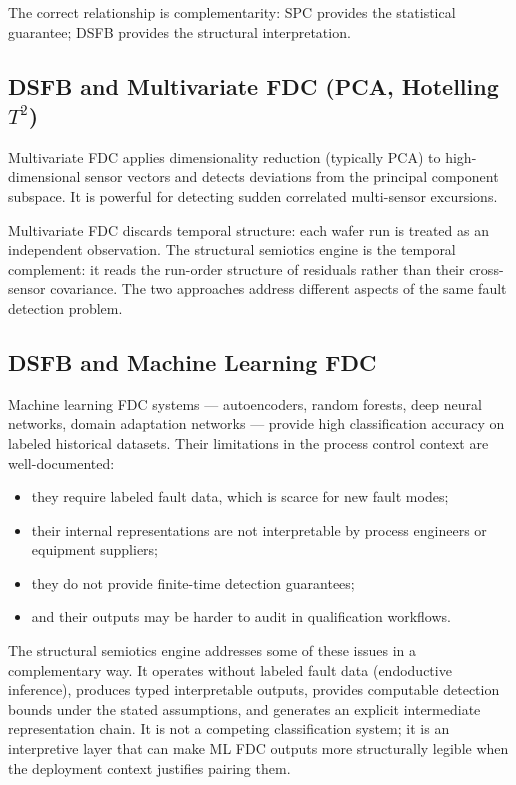 \documentclass[11pt,letterpaper]{article}
\theoremstyle{scresult}
\begin{document}
The correct relationship is complementarity: SPC provides the statistical
guarantee; DSFB provides the structural interpretation.

\subsection{\texorpdfstring{DSFB and Multivariate FDC (PCA, Hotelling $T^2$)}{DSFB and Multivariate FDC (PCA, Hotelling T2)}}

Multivariate FDC applies dimensionality reduction (typically PCA) to
high-dimensional sensor vectors and detects deviations from the principal
component subspace. It is powerful for detecting sudden correlated
multi-sensor excursions.

Multivariate FDC discards temporal structure: each wafer run is treated as
an independent observation. The structural semiotics engine is the
temporal complement: it reads the run-order structure of residuals rather
than their cross-sensor covariance. The two approaches address different
aspects of the same fault detection problem.

\subsection{DSFB and Machine Learning FDC}

Machine learning FDC systems --- autoencoders, random forests, deep neural
networks, domain adaptation networks --- provide high classification accuracy
on labeled historical datasets. Their limitations in the process control
context are well-documented:
\begin{itemize}
  \item they require labeled fault data, which is scarce for new fault modes;
  \item their internal representations are not interpretable by process
        engineers or equipment suppliers;
  \item they do not provide finite-time detection guarantees;
  \item and their outputs may be harder to audit in qualification workflows.
\end{itemize}

The structural semiotics engine addresses some of these issues in a
complementary way. It operates without labeled fault data (endoductive
inference), produces typed interpretable outputs, provides computable detection
bounds under the stated assumptions, and generates an explicit intermediate
representation chain. It is not a competing classification system; it is an
interpretive layer that can make ML FDC outputs more structurally legible when
the deployment context justifies pairing them.
\end{document}
